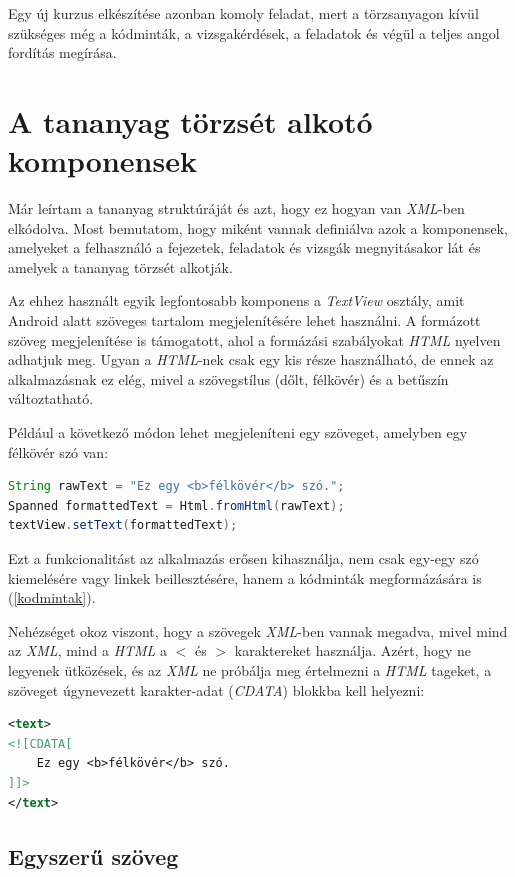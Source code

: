 \documentclass[12pt,a4paper]{article}
\newcommand{\xml}{\textit{XML}\xspace}
\begin{document}
	Egy új kurzus elkészítése azonban komoly feladat, mert a törzsanyagon kívül szükséges még a kódminták, a vizsgakérdések, a feladatok és végül a teljes angol fordítás megírása.
	
	\section{A tananyag törzsét alkotó komponensek}\label{tananyag_torzse}

	Már leírtam a tananyag struktúráját és azt, hogy ez hogyan van \xml-ben elkódolva. Most bemutatom, hogy miként vannak definiálva azok a komponensek, amelyeket a felhasználó a fejezetek, feladatok és vizsgák megnyitásakor lát és amelyek a tananyag törzsét alkotják.
	
	Az ehhez használt egyik legfontosabb komponens a \textit{TextView} osztály, amit Android alatt szöveges tartalom megjelenítésére lehet használni. A formázott szöveg megjelenítése is támogatott, ahol a formázási szabályokat \textit{HTML} nyelven adhatjuk meg. Ugyan a \textit{HTML}-nek csak egy kis része használható, de ennek az alkalmazásnak ez elég, mivel a szövegstílus (dőlt, félkövér) és a betűszín változtatható.
	
	Például a következő módon lehet megjeleníteni egy szöveget, amelyben egy félkövér szó van:
	
	\bigskip
	\begin{lstlisting}[language=Java]
String rawText = "Ez egy <b>félkövér</b> szó.";
Spanned formattedText = Html.fromHtml(rawText);
textView.setText(formattedText);
	\end{lstlisting}
	\bigskip
	
	Ezt a funkcionalitást az alkalmazás erősen kihasználja, nem csak egy-egy szó kiemelésére vagy linkek beillesztésére, hanem a kódminták megformázására is (\ref{kodmintak}).
	
	Nehézséget okoz viszont, hogy a szövegek \xml-ben vannak megadva, mivel mind az \xml, mind a \textit{HTML} a $<$ és $>$ karaktereket használja. Azért, hogy ne legyenek ütközések, és az \xml ne próbálja meg értelmezni a \textit{HTML} tageket, a szöveget úgynevezett karakter-adat (\textit{CDATA}) blokkba kell helyezni:
	
	\bigskip
	\begin{lstlisting}[language=XML]
<text>
<![CDATA[
	Ez egy <b>félkövér</b> szó.
]]>
</text>
	\end{lstlisting}
	
	\subsection{Egyszerű szöveg}
	
\end{document}
